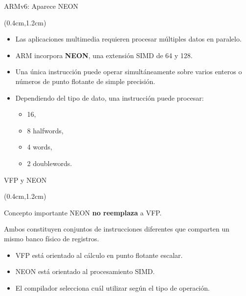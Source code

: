 
\begin{frame}{ARMv6: Aparece NEON}
 \begin{textblock*}{\textwidth}(0.4cm,1.2cm)
  \begin{itemize}[<+->]\justifying \parskip 0.2cm
   \item Las aplicaciones multimedia requieren procesar múltiples datos en paralelo.
   \item ARM incorpora \textbf{NEON}, una extensión SIMD de \SI{64}{\bit} y \SI{128}{\bit}.
   \item Una única instrucción puede operar simultáneamente sobre varios enteros o números de punto flotante de simple precisión.
   \item Dependiendo del tipo de dato, una instrucción puede procesar:
   \begin{itemize}\justifying \parskip 0.2cm
    \item \SI{16}{\byte},
    \item 8 halfwords,
    \item 4 words,
    \item 2 doublewords.
   \end{itemize}
  \end{itemize}
 \end{textblock*}
\end{frame}


\begin{frame}{VFP y NEON}
 \begin{textblock*}{\textwidth}(0.4cm,1.2cm)
  \begin{block}{Concepto importante}\justifying
   NEON \textbf{no reemplaza} a VFP.

   Ambos constituyen conjuntos de instrucciones diferentes que comparten un mismo banco físico de registros.
  \end{block}
  \vspace{0.3cm}
  \begin{itemize}[<+(1)->]\justifying
   \item VFP está orientado al cálculo en punto flotante escalar.
   \item NEON está orientado al procesamiento SIMD.
   \item El compilador selecciona cuál utilizar según el tipo de operación.
  \end{itemize}
 \end{textblock*}
\end{frame}


